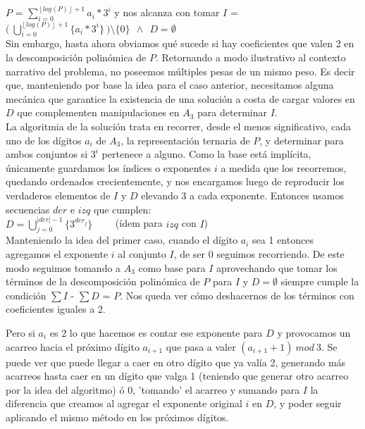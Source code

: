 	$P$ = $\sum_{i = 0}^{\left \lfloor{log(P)}\right \rfloor + 1} a_i*3^{i}$ y nos alcanza con tomar $I$ = $\bigl ( \ \bigcup_{i=0}^{\left \lfloor{log(P)}\right \rfloor + 1} \{a_i*3^{i}\} \ \bigr ) \setminus \{0\} \ \ \wedge \ \ D = \emptyset $
	\\

	Sin embargo, hasta ahora obviamos qué sucede si hay coeficientes que valen 2 en la descomposición polinómica de $P$. Retornando a modo ilustrativo al contexto narrativo del problema, no poseemos múltiples pesas de un mismo peso. Es decir que, manteniendo por base la idea para el caso anterior, necesitamos alguna mecánica que garantice la existencia de una solución a costa de cargar valores en $D$ que complementen manipulaciones en $A_3$ para determinar $I$.
	\\

	La algoritmia de la solución trata en recorrer, desde el menos significativo, cada uno de los dígitos $a_i$ de $A_3$, la representación ternaria de $P$, y determinar para ambos conjuntos si $3^{i}$ pertenece a alguno. Como la base está implícita, únicamente guardamos los índices o exponentes $i$ a medida que los recorremos, quedando ordenados crecientemente, y nos encargamos luego de reproducir los verdaderos elementos de $I$ y $D$ elevando 3 a cada exponente. Entonces usamos secuencias $der$ e $izq$ que cumplen:
	\\

	$D = \bigcup_{j=0}^{|der|-1} \{3^{der_{j}}\}  $   \  \ \ \ (ídem para $izq$ con $I$)
	\\

	Manteniendo la idea del primer caso, cuando el dígito $a_i$ sea 1 entonces agregamos el exponente $i$ al conjunto $I$, de ser 0 seguimos recorriendo. De este modo seguimos tomando a $A_3$ como base para $I$ aprovechando que tomar los términos de la descomposición polinómica de $P$ para $I$ y $D = \emptyset$ siempre cumple la condición $\sum I$ - $\sum D$ = $P$. Nos queda ver cómo deshacernos de los términos con coeficientes iguales a 2.

	Pero si $a_i$ es 2 lo que hacemos es contar ese exponente para $D$ y provocamos un acarreo hacia el próximo dígito $a_{i+1}$ que pasa a valer $(a_{i+1} + 1) \ mod \ 3$. Se puede ver que puede llegar a caer en otro dígito que ya valía 2, generando más acarreos hasta caer en un dígito que valga 1 (teniendo que generar otro acarreo por la idea del algoritmo) ó 0, 'tomando' el acarreo y sumando para $I$ la diferencia que creamos al agregar el exponente original $i$ en $D$, y poder seguir aplicando el mismo método en los próximos dígitos.


